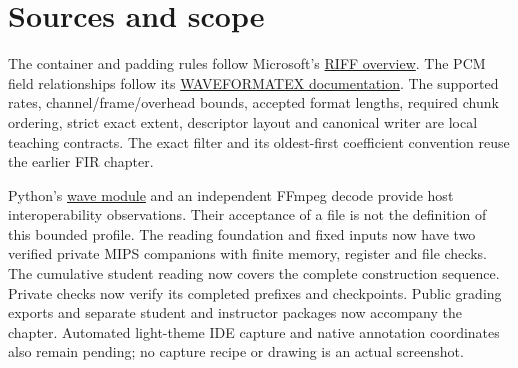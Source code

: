 \enlargethispage{3\baselineskip}
\section{Sources and scope}
The container and padding rules follow Microsoft's
\href{https://learn.microsoft.com/en-us/windows/win32/xaudio2/resource-interchange-file-format--riff-}{RIFF overview}.
The PCM field relationships follow its
\href{https://learn.microsoft.com/en-us/windows/win32/api/mmeapi/ns-mmeapi-waveformatex}{WAVEFORMATEX documentation}.
The supported rates, channel/frame/overhead bounds, accepted format lengths, required
chunk ordering, strict exact extent, descriptor layout and canonical writer are local
teaching contracts. The exact filter and its oldest-first coefficient convention
reuse the earlier FIR chapter.

Python's \href{https://docs.python.org/3/library/wave.html}{wave module} and an
independent FFmpeg decode provide host interoperability observations. Their acceptance
of a file is not the definition of this bounded profile. The reading foundation and fixed inputs now have two verified private MIPS
companions with finite memory, register and file checks. The cumulative student reading now covers the complete construction sequence.
Private checks now verify its completed prefixes and checkpoints. Public grading exports and separate student and instructor packages now accompany
the chapter. Automated light-theme IDE capture and native annotation
coordinates also remain pending; no capture recipe or drawing is an actual screenshot.
